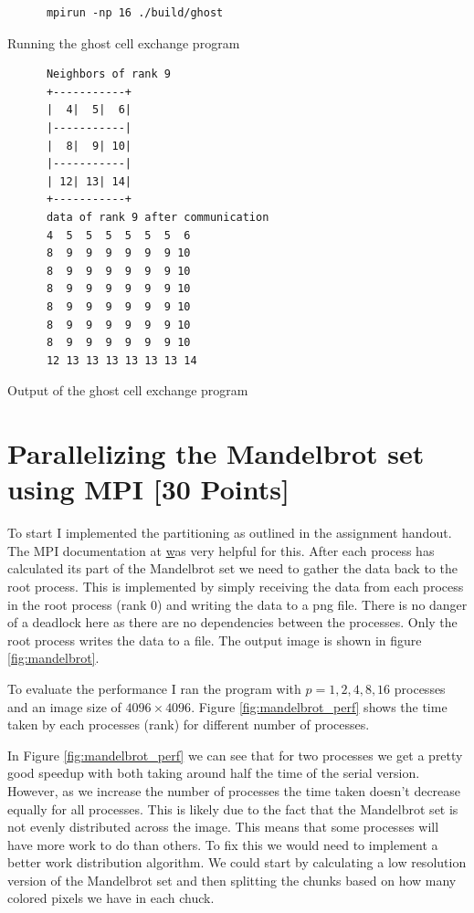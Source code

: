 \documentclass[unicode,11pt,a4paper,oneside,numbers=endperiod,openany]{scrartcl}
\begin{document}
\begin{listing}[h!t]
      \begin{verbatim}
      mpirun -np 16 ./build/ghost
      \end{verbatim}
      \caption{Running the ghost cell exchange program}
      \label{lst:ghost_run}
\end{listing}

\begin{listing}[h!t]
      \begin{verbatim}
      Neighbors of rank 9
      +-----------+
      |  4|  5|  6|
      |-----------|
      |  8|  9| 10|
      |-----------|
      | 12| 13| 14|
      +-----------+
      data of rank 9 after communication
      4  5  5  5  5  5  5  6 
      8  9  9  9  9  9  9 10 
      8  9  9  9  9  9  9 10 
      8  9  9  9  9  9  9 10 
      8  9  9  9  9  9  9 10 
      8  9  9  9  9  9  9 10 
      8  9  9  9  9  9  9 10 
      12 13 13 13 13 13 13 14 
      \end{verbatim}
      \caption{Output of the ghost cell exchange program}
      \label{lst:ghost_output}
\end{listing}


\section{Parallelizing the Mandelbrot set using MPI [30 Points]}

To start I implemented the partitioning as outlined in the assignment handout. The MPI documentation at \href{https://rookiehpc.org/mpi/docs/} was very helpful for this. After each process has calculated its part of the Mandelbrot set we need to gather the data back to the root process. This is implemented by simply receiving the data from each process in the root process (rank 0) and writing the data to a png file. There is no danger of a deadlock here as there are no dependencies between the processes. Only the root process writes the data to a file. The output image is shown in figure \ref{fig:mandelbrot}.

To evaluate the performance I ran the program with $p = 1, 2, 4, 8, 16$ processes and an image size of $4096 \times 4096$. Figure \ref{fig:mandelbrot_perf} shows the time taken by each processes (rank) for different number of processes.

In Figure \ref{fig:mandelbrot_perf} we can see that for two processes we get a pretty good speedup with both taking around half the time of the serial version. However, as we increase the number of processes the time taken doesn't decrease equally for all processes. This is likely due to the fact that the Mandelbrot set is not evenly distributed across the image. This means that some processes will have more work to do than others. To fix this we would need to implement a better work distribution algorithm. We could start by calculating a low resolution version of the Mandelbrot set and then splitting the chunks based on how many colored pixels we have in each chuck.
\end{document}
